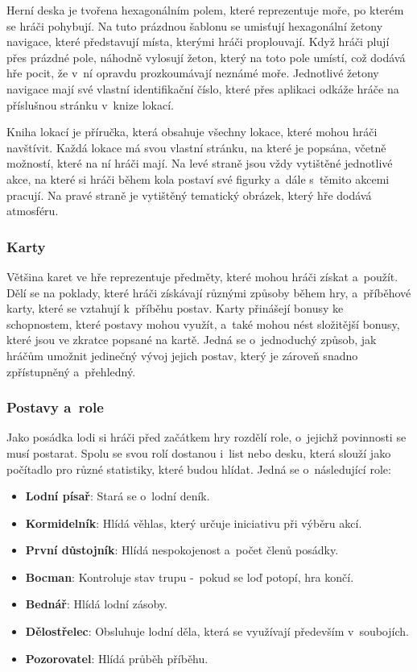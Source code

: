 Herní deska je tvořena hexagonálním polem, které reprezentuje moře, po kterém se hráči pohybují. Na tuto prázdnou šablonu se umisťují hexagonální žetony navigace, které představují místa, kterými hráči proplouvají. Když hráči plují přes prázdné pole, náhodně vylosují žeton, který na toto pole umístí, což dodává hře pocit, že v~ní opravdu prozkoumávají neznámé moře. Jednotlivé žetony navigace mají své vlastní identifikační číslo, které přes aplikaci odkáže hráče na příslušnou stránku v~knize lokací.

Kniha lokací je příručka, která obsahuje všechny lokace, které mohou hráči navštívit. Každá lokace má svou vlastní stránku, na které je popsána, včetně možností, které na ní hráči mají. Na levé straně jsou vždy vytištěné jednotlivé akce, na které si hráči během kola postaví své figurky a~dále s~těmito akcemi pracují. Na pravé straně je vytištěný tematický obrázek, který hře dodává atmosféru.

\subsubsection*{Karty}
\label{subsubsec:fw_comp_cards}

Většina karet ve hře reprezentuje předměty, které mohou hráči získat a~použít. Dělí se na poklady, které hráči získávají různými způsoby během hry, a~příběhové karty, které se vztahují k~příběhu postav. Karty přinášejí bonusy ke schopnostem, které postavy mohou využít, a~také mohou nést složitější bonusy, které jsou ve zkratce popsané na kartě. Jedná se o~jednoduchý způsob, jak hráčům umožnit jedinečný vývoj jejich postav, který je zároveň snadno zpřístupněný a~přehledný.

\subsubsection*{Postavy a~role}
\label{subsubsec:fw_comp_roles}

Jako posádka lodi si hráči před začátkem hry rozdělí role, o~jejichž povinnosti se musí postarat. Spolu se svou rolí dostanou i~list nebo desku, která slouží jako počítadlo pro různé statistiky, které budou hlídat. Jedná se o~následující role:

\begin{itemize}
    \item \textbf{Lodní písař}: Stará se o~lodní deník.
    \item \textbf{Kormidelník}: Hlídá věhlas, který určuje iniciativu při výběru akcí.
    \item \textbf{První důstojník}: Hlídá nespokojenost a~počet členů posádky.
    \item \textbf{Bocman}: Kontroluje stav trupu -~pokud se loď potopí, hra končí.
    \item \textbf{Bednář}: Hlídá lodní zásoby.
    \item \textbf{Dělostřelec}: Obsluhuje lodní děla, která se využívají především v~soubojích.
    \item \textbf{Pozorovatel}: Hlídá průběh příběhu.
\end{itemize}


